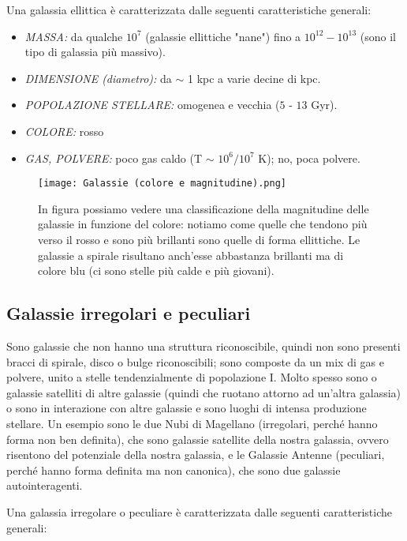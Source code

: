 Una galassia ellittica è caratterizzata dalle seguenti caratteristiche generali:
\begin{itemize}
    \item \emph{MASSA:} da qualche $10^7$ \unit{\solarmass{}} (galassie ellittiche "nane") fino a $10^{12} - 10^{13}$ \unit{\solarmass{}} (sono il tipo di galassia più massivo).
    \item \emph{DIMENSIONE (diametro):} da $\sim$ 1 kpc a varie decine di kpc. 
    \item \emph{POPOLAZIONE STELLARE:} omogenea e vecchia ($5$ - $13$ Gyr).
    \item \emph{COLORE:} rosso
    \item \emph{GAS, POLVERE:} poco gas caldo (T $\sim$ $10^6/10^7$ K); no, poca polvere.
\end{itemize}

\begin{figure}
    \centering
    \texttt{[image: Galassie (colore e magnitudine).png]}
    \caption{In figura possiamo vedere una classificazione della magnitudine delle galassie in funzione del colore: notiamo come quelle che tendono più verso il rosso e sono più brillanti sono quelle di forma ellittiche. Le galassie a spirale risultano anch'esse abbastanza brillanti ma di colore blu (ci sono stelle più calde e più giovani).}
    \label{fig:galassie-colore-magnitudine}
\end{figure}

\subsection{Galassie irregolari e peculiari}
Sono galassie che non hanno una struttura riconoscibile, quindi non sono presenti bracci di spirale, disco o bulge riconoscibili; sono composte da un mix di gas e polvere, unito a stelle tendenzialmente di popolazione I. Molto spesso sono o galassie satelliti di altre galassie (quindi che ruotano attorno ad un'altra galassia) o sono in interazione con altre galassie e sono luoghi di intensa produzione stellare. Un esempio sono le due Nubi di Magellano (irregolari, perché hanno forma non ben definita), che sono galassie satellite della nostra galassia, ovvero risentono del potenziale della nostra galassia, e le Galassie Antenne (peculiari, perché hanno forma definita ma non canonica), che sono due galassie autointeragenti. 

Una galassia irregolare o peculiare è caratterizzata dalle seguenti caratteristiche generali:

